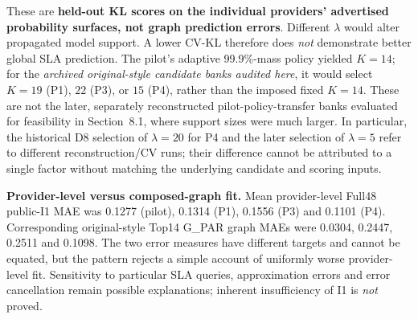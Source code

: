 \documentclass[10pt,a4paper]{article}
\begin{document}
These are \textbf{held-out KL scores on the individual providers' advertised probability surfaces, not graph prediction errors}. Different $\lambda$ would alter propagated model support. A lower CV-KL therefore does \emph{not} demonstrate better global SLA prediction. The pilot's adaptive 99.9\%-mass policy yielded $K=14$; for the \emph{archived original-style candidate banks audited here}, it would select $K=19$ (P1), $22$ (P3), or $15$ (P4), rather than the imposed fixed $K=14$. These are not the later, separately reconstructed pilot-policy-transfer banks evaluated for feasibility in Section~8.1, where support sizes were much larger. In particular, the historical D8 selection of $\lambda=20$ for P4 and the later selection of $\lambda=5$ refer to different reconstruction/CV runs; their difference cannot be attributed to a single factor without matching the underlying candidate and scoring inputs.

\textbf{Provider-level versus composed-graph fit.} Mean provider-level Full48 public-I1 MAE was 0.1277 (pilot), 0.1314 (P1), 0.1556 (P3) and 0.1101 (P4). Corresponding original-style Top14 G\_PAR graph MAEs were 0.0304, 0.2447, 0.2511 and 0.1098. The two error measures have different targets and cannot be equated, but the pattern rejects a simple account of uniformly worse provider-level fit. Sensitivity to particular SLA queries, approximation errors and error cancellation remain possible explanations; inherent insufficiency of I1 is \emph{not} proved.
\end{document}
